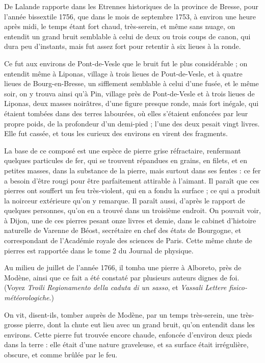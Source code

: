 \documentclass[a4paper, 12pt, oneside, french]{article}
\begin{document}
De Lalande rapporte dans les Etrennes historiques de la province de Bresse, pour l'année bissextile 1756, que dans le mois de septembre 1753, à environ une heure après midi, le temps étant fort chaud, très-serein, et même sans nuage, on entendit un grand bruit semblable à celui de deux ou trois coups de canon, qui dura peu d'instants, mais fut assez fort pour retentir à six lieues à la ronde.

Ce fut aux environs de Pont-de-Vesle que le bruit fut le plus considérable ; on entendit même à Liponas, village à trois lieues de Pout-de-Vesle, et à quatre lieues de Bourg-en-Bresse, un sifflement semblable à celui d'une fusée, et le même soir, on y trouva ainsi qu'à Pin, village près de Pont-de-Vesle et à trois lieues de Liponas, deux masses noirâtres, d'une figure presque ronde, mais fort inégale, qui étaient tombées dans des terres labourées, où elles s'étaient enfoncées par leur propre poids, de la profondeur d'un demi-pied ; l'une des deux pesait vingt livres. Elle fut cassée, et tous les curieux des environs en virent des fragments.

La base de ce composé est une espèce de pierre grise réfractaire, renfermant quelques particules de fer, qui se trouvent répandues en grains, en filets, et en petites masses, dans la substance de la pierre, mais surtout dans ses fentes : ce fer a besoin d'être rougi pour être parfaitement attirable à l'aimant. Il paraît que ces pierres ont souffert un feu très-violent, qui en a fondu la surface ; ce qui a produit la noirceur extérieure qu'on y remarque. Il paraît aussi, d'après le rapport de quelques personnes, qu'on en a trouvé dans un troisième endroit. On pouvait voir, à Dijon, une de ces pierres pesant onze livres et demie, dans le cabinet d'histoire naturelle de Varenne de Béost, secrétaire en chef des états de Bourgogne, et correspondant de l'Académie royale des sciences de Paris. Cette même chute de pierres est rapportée dans le tome 2 du Journal de physique.

Au milieu de juillet de l'année 1766, il tomba une pierre à Alboreto, près de Modène, ainsi que ce fait a été constaté par plusieurs auteurs dignes de foi. (Voyez \emph{Troili Regionamento della caduta di un sasso}, et \emph{Vassali Lettere fisico-météorologiche}.)

On vit, disent-ils, tomber auprès de Modène, par un temps très-serein, une très-grosse pierre, dont la chute eut lieu avec un grand bruit, qu'on entendit dans les environs. Cette pierre fut trouvée encore chaude, enfoncée d'environ deux pieds dans la terre : elle était d'une nature graveleuse, et sa surface était irrégulière, obscure, et comme brûlée par le feu.
\end{document}
